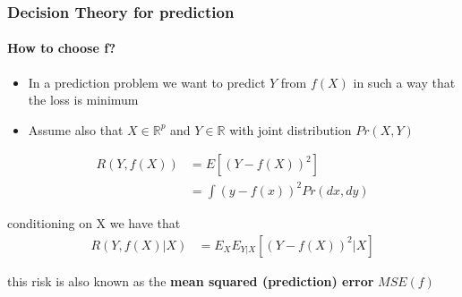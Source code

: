 \documentclass[
  shownotes,
  xcolor={svgnames},
  hyperref={colorlinks,citecolor=DarkBlue,linkcolor=DarkRed,urlcolor=DarkBlue}
  , aspectratio=169]{beamer}
\begin{document}

\begin{frame}

\frametitle{ Decision Theory for prediction}
\framesubtitle{How to choose f?}
\begin{itemize}
  \item In a prediction problem we want to predict $Y$ from $f(X)$ in such a way that the loss is minimum
  \item Assume also that $X \in \mathbb{R}^p$ and $Y \in \mathbb{R}$ with joint distribution $Pr(X,Y)$
\end{itemize}

\begin{align}
  R(Y,f(X)) &=E[(Y-f(X))^2] \\
            &=\int (y-f(x))^2 Pr(dx,dy)
\end{align}

conditioning on X we have that
\begin{align}
 R(Y,f(X)|X) &= E_X E_{Y|X} [(Y-f(X))^2|X]
\end{align}

this risk is also known as the {\bf mean squared (prediction) error} $MSE(f)$ 
\end{frame}
\end{document}
